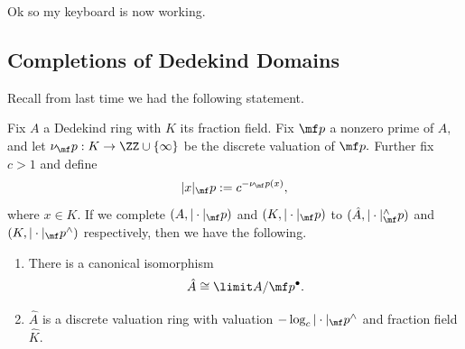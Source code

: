 \documentclass[../notes.tex]{subfiles}
\begin{document}














Ok so my keyboard is now working.

\subsection{Completions of Dedekind Domains}
Recall from last time we had the following statement.
\begin{proposition}
	Fix $A$ a Dedekind ring with $K$ its fraction field. Fix $\mf p$ a nonzero prime of $A,$ and let $\nu_\mf p:K\to\ZZ\cup\{\infty\}$ be the discrete valuation of $\mf p.$ Further fix $c>1$ and define
	\[|x|_\mf p:=c^{-\nu_\mf p(x)},\]
	where $x\in K.$ If we complete $(A,|\cdot|_\mf p)$ and $(K,|\cdot|_\mf p)$ to $(\hat A,|\cdot|^\wedge_\mf p)$ and $(K,|\cdot|_\mf p^\wedge)$ respectively, then we have the following.
	\begin{enumerate}[label=(\alph*)]
		\item There is a canonical isomorphism
		\[\hat A\cong\limit A/\mf p^\bullet.\]
		\item $\hat A$ is a discrete valuation ring with valuation $-\log_c|\cdot|_\mf p^\wedge$ and fraction field $\hat K.$
	\end{enumerate}
\end{proposition}
\end{document}
